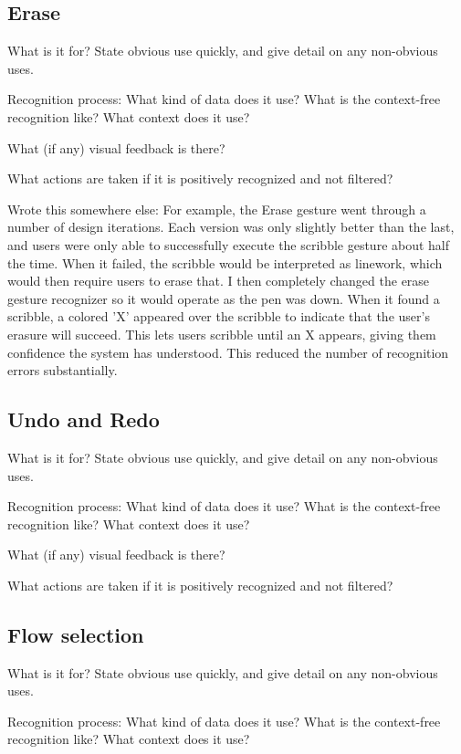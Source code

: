 \subsection{Erase}

What is it for? State obvious use quickly, and give detail on any
non-obvious uses.

Recognition process: What kind of data does it use? What is the
context-free recognition like? What context does it use?

What (if any) visual feedback is there?

What actions are taken if it is positively recognized and not
filtered?

Wrote this somewhere else: For example, the Erase gesture went through
a number of design iterations. Each version was only slightly better
than the last, and users were only able to successfully execute the
scribble gesture about half the time. When it failed, the scribble
would be interpreted as linework, which would then require users to
erase that. I then completely changed the erase gesture recognizer so
it would operate as the pen was down. When it found a scribble, a
colored 'X' appeared over the scribble to indicate that the user's
erasure will succeed. This lets users scribble until an X appears,
giving them confidence the system has understood. This reduced the
number of recognition errors substantially.

\subsection{Undo and Redo}

What is it for? State obvious use quickly, and give detail on any
non-obvious uses.

Recognition process: What kind of data does it use? What is the
context-free recognition like? What context does it use?

What (if any) visual feedback is there?

What actions are taken if it is positively recognized and not
filtered?

\subsection{Flow selection}

What is it for? State obvious use quickly, and give detail on any
non-obvious uses.

Recognition process: What kind of data does it use? What is the
context-free recognition like? What context does it use?

